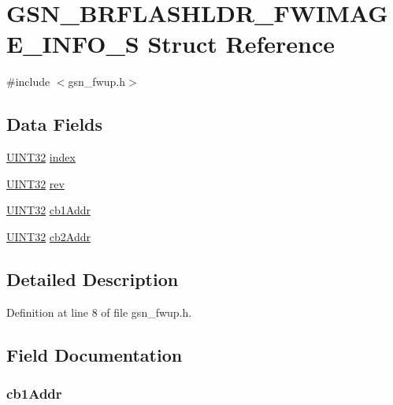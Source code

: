 \hypertarget{a00027}{
\section{GSN\_\-BRFLASHLDR\_\-FWIMAGE\_\-INFO\_\-S Struct Reference}
\label{a00027}
}


{\ttfamily \#include $<$gsn\_\-fwup.h$>$}

\subsection*{Data Fields}
\begin{DoxyCompactItemize}
\item 
\hyperlink{a00660_gae1e6edbbc26d6fbc71a90190d0266018}{UINT32} \hyperlink{a00027_a02f6db92126361e55e3b4780f6b337ae}{index}
\item 
\hyperlink{a00660_gae1e6edbbc26d6fbc71a90190d0266018}{UINT32} \hyperlink{a00027_ab826479c6d1f61fb77c9c256182563df}{rev}
\item 
\hyperlink{a00660_gae1e6edbbc26d6fbc71a90190d0266018}{UINT32} \hyperlink{a00027_a2c070b4c213bd0188ec289a902bd6b73}{cb1Addr}
\item 
\hyperlink{a00660_gae1e6edbbc26d6fbc71a90190d0266018}{UINT32} \hyperlink{a00027_a11b562d4667b6205be4e6bd3abba3066}{cb2Addr}
\end{DoxyCompactItemize}


\subsection{Detailed Description}


Definition at line 8 of file gsn\_\-fwup.h.



\subsection{Field Documentation}
\hypertarget{a00027_a2c070b4c213bd0188ec289a902bd6b73}{
\subsubsection[{cb1Addr}]{ {\bf cb1Addr}}}
\label{a00027_a2c070b4c213bd0188ec289a902bd6b73}


